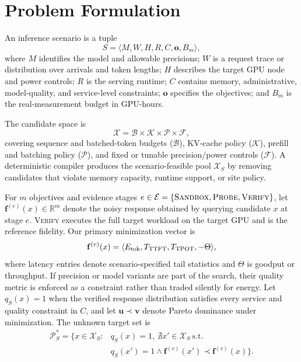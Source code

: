 \section{Problem Formulation}

An inference scenario is a tuple
\begin{equation}
S=\langle M,W,H,R,C,\mathbf o,B_m\rangle,
\end{equation}
where $M$ identifies the model and allowable precisions; $W$ is a request
trace or distribution over arrivals and token lengths; $H$ describes the
target GPU node and power controls; $R$ is the serving runtime; $C$ contains
memory, administrative, model-quality, and service-level constraints;
$\mathbf o$ specifies the objectives; and $B_m$ is the real-measurement budget
in GPU-hours.

The candidate space is
\begin{equation}
\mathcal X=\mathcal B\!\times\!\mathcal K\!\times\!\mathcal P\!\times\!
\mathcal F,
\end{equation}
covering sequence and batched-token budgets ($\mathcal B$), KV-cache policy
($\mathcal K$), prefill and batching policy ($\mathcal P$), and fixed or
tunable precision/power controls ($\mathcal F$).  A deterministic compiler
produces the scenario-feasible pool $\mathcal X_S$ by removing candidates that
violate memory capacity, runtime support, or site policy.

For $m$ objectives and evidence stages
$e\in\mathcal E=\{\textsc{Sandbox},\textsc{Probe},\textsc{Verify}\}$, let
$\mathbf f^{(e)}(x)\in\mathbb R^m$ denote the noisy response obtained by
querying candidate $x$ at stage $e$.  \textsc{Verify} executes the full target
workload on the target GPU and is the reference fidelity.  Our primary
minimization vector is
\begin{equation}
\mathbf f^{(v)}(x)=
\langle E_{\rm tok},T_{\rm TTFT},T_{\rm TPOT},-\Theta\rangle,
\end{equation}
where latency entries denote scenario-specified tail statistics and $\Theta$
is goodput or throughput.  If precision or model variants are part of the
search, their quality metric is enforced as a constraint rather than traded
silently for energy.  Let $q_S(x)=1$ when the verified response distribution
satisfies every service and quality constraint in $C$, and let
$\mathbf u\prec\mathbf v$ denote Pareto dominance under minimization.  The
unknown target set is
\begin{align}
\mathcal P_S^*=\{x\in\mathcal X_S:
&q_S(x)=1,\ \nexists x'\in\mathcal X_S\ \text{s.t.}\nonumber\\[-2pt]
&q_S(x')=1\land
\mathbf f^{(v)}(x')\prec\mathbf f^{(v)}(x)\}.
\label{eq:true-frontier}
\end{align}

